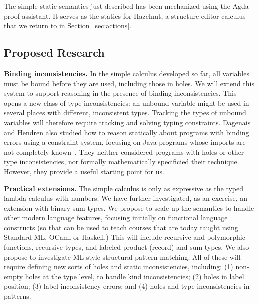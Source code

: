 The simple static semantics just described has been mechanized using the Agda proof assistant. It serves as the statics for Hazelnut, a structure editor calculus that we return to in Section~\ref{sec:actions}.

\subsection{Proposed Research}

\noindent\textbf{Binding inconsistencies.} In the simple calculus developed so far,
    all variables must be bound before they are used,
    including those in holes. We will extend this system to support reasoning
    in the presence of binding inconsistencies. This 
    opens a new class of type inconsistencies: an unbound variable
    might be used in several places with different, inconsistent types. Tracking
    the types of unbound variables will therefore require tracking and solving typing constraints.  Dagenais and
    Hendren also studied how to reason statically about programs
    with binding errors using a constraint system, focusing on
    Java programs whose imports are not completely known~\cite{DBLP:conf/oopsla/DagenaisH08}. They neither
    considered programs with holes or other type inconsistencies,
    nor formally mathematically specificied their
    technique. However, they provide a useful starting point for us.

\vspace{0.25ex} 
\noindent\textbf{Practical extensions.} The simple calculus
    is only as expressive as the typed lambda calculus with numbers. We have further investigated,
    as an exercise, an extension with binary sum
    types. We propose to scale up the semantics to handle other modern language
    features, focusing initially on functional language
    constructs (so that \HazelEnv can be used to teach courses that
    are today taught using Standard ML, OCaml or Haskell.) This will include recursive and
    polymorphic functions, recursive types, and labeled product (record) and sum types.
    We also propose to investigate ML-style structural pattern
    matching. All of these will require defining new sorts of holes and static
    inconsistencies, including: (1) non-empty holes at the type level, to handle
    kind inconsistencies; (2) holes in label position; (3) label inconsistency
    errors; and (4) holes and type inconsistencies in patterns. 

